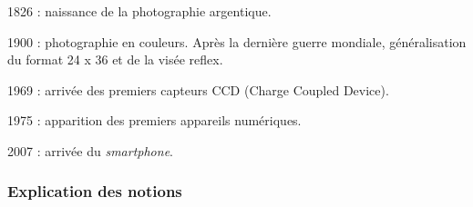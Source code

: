 
\begin{tcolorbox}[title={Repères historiques}, toprule=0pt, leftrule=0pt, rightrule=0pt, arc=0pt,
                  fonttitle=\scshape\boxtitlefont,
                  colbacktitle=white, coltitle=firstcolor, colframe=firstcolor, colback=firstcolor!10,
                  breakable, enhanced jigsaw]
\begin{jazzitemize}
\item 1826 : naissance de la photographie argentique.
\item 1900 : photographie en couleurs. Après la dernière guerre mondiale, généralisation du format 24 x 36 et de la visée reflex.
\item 1969 : arrivée des premiers capteurs CCD (Charge Coupled Device). 
\item 1975 : apparition des premiers appareils numériques.
\item 2007 : arrivée du \textit{smartphone}.
\end{jazzitemize}
\end{tcolorbox}

\subsubsection[Explication des notions]{Explication des notions}
\label{subsub:VIII.2.1.3}



